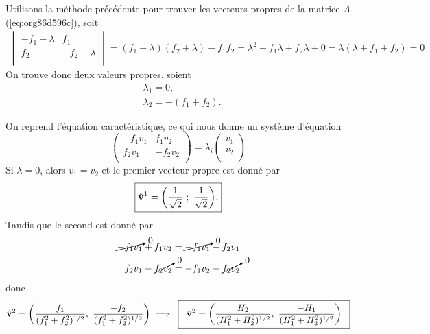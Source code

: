 \documentclass[10pt]{article}
\numberwithin{equation}{section}
\newcommand{\vv}{\vb{v}}
\begin{document}
Utilisons la méthode précédente pour trouver les vecteurs propres de la matrice \(A\) (\ref{eq:org86d596c}), soit
\begin{align}
   \begin{vmatrix}
     -f_1 - \lambda & f_1 \\
     f_2 & -f_2 - \lambda \\
   \end{vmatrix} = (f_1+\lambda)(f_2+\lambda) - f_1 f_2 = \lambda^2 + f_1 \lambda + f_2 \lambda + 0 =\boxed{ \lambda(\lambda + f_1 + f_2) = 0 }
\end{align}
On trouve donc deux valeurs propres, soient
\begin{subequations}
\begin{align}
   & \lambda_1 = 0, \\
   & \lambda_2 = - (f_1+f_2).
\end{align}
\end{subequations}

On reprend l'équation caractéristique, ce qui nous donne un système d'équation
\begin{equation}
   \begin{pmatrix}
     - f_1 v_1 & f_1 v_2 \\
     f_2 v_1 & -f_2 v_2 \\
   \end{pmatrix} = \lambda_i
   \begin{pmatrix}
     v_1\\
     v_2\\
   \end{pmatrix}
\end{equation}
Si \(\lambda = 0\), alors \(v_1 = v_2\) et le premier vecteur propre est donné par
\begin{equation}
   \boxed{\hat{\vv}^1 = \qty( \frac{1}{\sqrt{2}}\ ;\ \frac{1}{\sqrt{2}}).}
\end{equation}
Tandis que le second est donné par
\begin{align}
   \cancelto{0}{-f_1 v_1} + f_1 v_2 & = \cancelto{0}{-f_1 v_1} - f_2 v_1 \\
   f_2 v_1 - \cancelto{0}{f_2 v_2} & = -f_1 v_2 - \cancelto{0}{f_2 v_2} \\
\end{align}
donc
\begin{equation}
   \hat{\vv}^2 = \qty( \frac{f_1}{(f_1^2+f_2^2)^{1/2}},\ \frac{-f_2}{(f_1^2+f_2^2)^{1/2}})\ \Longrightarrow \hspace{0.2cm}\boxed{\hspace{0.2cm}\hat{\vv}^2=\qty( \frac{H_2}{(H_1^2+H_2^2)^{1/2}},\ \frac{-H_1}{(H_1^2+H_2^2)^{1/2}})\hspace{0.2cm}}
\end{equation}
\end{document}
